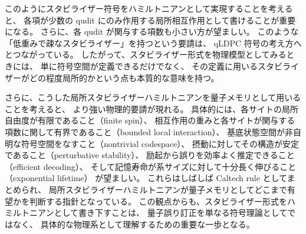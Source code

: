\documentclass[../master.tex]{subfiles}
\begin{document}
このようにスタビライザー符号をハミルトニアンとして実現することを考えると、
各項が少数の qudit にのみ作用する局所相互作用として書けることが重要になる。
さらに、各 qudit が関与する項数も小さい方が望ましい。
このような「低重みで疎なスタビライザー」を持つという要請は、
qLDPC 符号の考え方へとつながっている。
したがって、スタビライザー形式を物理模型としてみるときには、
単に符号空間が定義できるだけでなく、
その定義に用いるスタビライザーがどの程度局所的かという点も本質的な意味を持つ。

さらに、こうした局所スタビライザーハミルトニアンを量子メモリとして用いることを考えると、
より強い物理的要請が現れる。
具体的には、各サイトの局所自由度が有限であること（finite spin）、
相互作用の重みと各サイトが関与する項数に関して有界であること（bounded local interaction）、
基底状態空間が非自明な符号空間をなすこと（nontrivial codespace）、
摂動に対してその構造が安定であること（perturbative stability）、
励起から誤りを効率よく推定できること（efficient decoding）、
そして記憶寿命が系サイズに対して十分長く伸びること（exponential lifetime）
が望ましい。
これらはしばしば Caltech rule としてまとめられ、
局所スタビライザーハミルトニアンが量子メモリとしてどこまで有望かを判断する指針となっている。
この観点からも、スタビライザー形式をハミルトニアンとして書き下すことは、
量子誤り訂正を単なる符号理論としてではなく、
具体的な物理系として理解するための重要な一歩となる。
\end{document}

